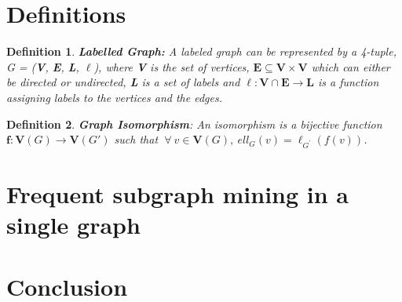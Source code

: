 \documentclass{article}      %
\newtheorem{definition}{Definition}
\begin{document}
\section{Definitions}
\begin{definition}
{\bf Labelled Graph:} A labeled graph can be represented by a 4-tuple, G = ({\bf V}, {\bf E}, {\bf L}, $\ell$), where {\bf V} is 
the set of vertices, ${\mathbf E} \subseteq {\mathbf V} \times {\mathbf V}$ which can either be directed or undirected, {\bf L}
is a set of labels and $\ell: {\mathbf V} \cap {\mathbf E} \rightarrow {\mathbf L}$ is a function assigning labels to the vertices and the edges.
\end{definition}
\begin{definition}
{\bf Graph Isomorphism}: An isomorphism is a bijective function ${\mathbf f}: {\mathbf V(G)} \rightarrow {\mathbf V(G')}$ such that
$\: \forall \:v \in {\mathbf V(G)},\: ell_G(v) = \ell_{G^{'}} (f(v))$.
\end{definition}

\section{Frequent subgraph mining in a single graph}

\section{Conclusion}



\end{document}
